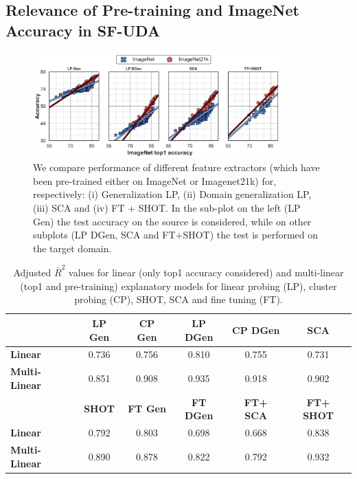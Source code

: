 \documentclass{article}
\begin{document}
\subsection{Relevance of Pre-training and ImageNet Accuracy in SF-UDA}
\label{modselection}
\begin{figure}[t]
\begin{center}
\includegraphics[width=0.85\textwidth]{images/four_model_plots_lines_v2.png}
\end{center}
\caption{We compare performance of different feature extractors (which have been pre-trained either on ImageNet or Imagenet21k) for, respectively: (i) Generalization LP, (ii) Domain generalization LP, (iii) SCA and (iv) FT + SHOT.
In the sub-plot on the left (LP Gen) the test accuracy on the source is considered, while on other subplots (LP DGen, SCA and FT+SHOT) the test is performed on the target domain.
}
\label{multiplot}
\vspace{-0.3cm}
\end{figure}


\begin{table}[t]
\caption{Adjusted $\bar{R}^2$ values for linear (only top1 accuracy considered) and multi-linear (top1 and pre-training) explanatory models for linear probing (LP), cluster probing (CP), SHOT, SCA and fine tuning (FT).} 
\label{table_R}
\begin{center}
\begin{adjustbox}{max width=0.65\textwidth}
\begin{tabular}{lccccc}

\toprule
& \textbf{LP Gen} & \textbf{CP Gen} & \textbf{LP DGen} & \textbf{CP DGen} & \textbf{SCA}\\
\midrule
\textbf{Linear} & 0.736 & 0.756 & 0.810 & 0.755 & 0.731 \\
\textbf{Multi-Linear} & 0.851 & 0.908 & 0.935 & 0.918 & 0.902 \\
\midrule
\midrule
& \textbf{SHOT} & \textbf{FT Gen} & \textbf{FT DGen} & \textbf{FT+ SCA} & \textbf{FT+ SHOT}\\
\midrule
\textbf{Linear} & 0.792 & 0.803 & 0.698 & 0.668 & 0.838\\
\textbf{Multi-Linear} & 0.890 & 0.878 & 0.822 & 0.792 & 0.932\\
\bottomrule

\end{tabular}
\end{adjustbox}
\end{center}
\vspace{-0.4cm}
\end{table}
\end{document}
